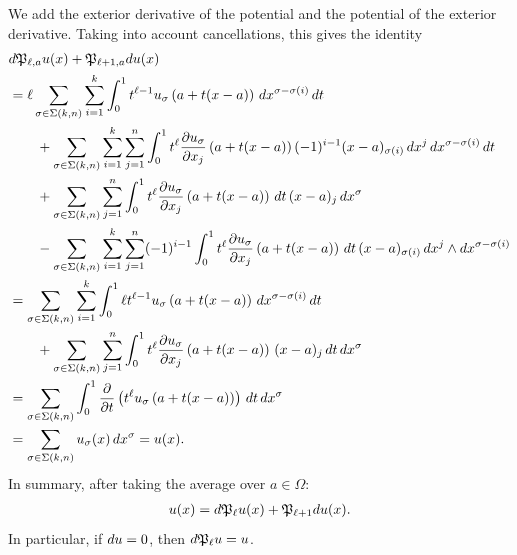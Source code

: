 \documentclass[10pt,letterpaper]{article}
\begin{document}
We add the exterior derivative of the potential and the potential of the exterior derivative.
Taking into account cancellations, this gives the identity 
\begin{align*}
    &
    d {\mathfrak P}_{\ell,a} u(x)
    +
    {\mathfrak P}_{\ell+1,a} d u(x)
    \\&
    =
    \ell
    \sum_{\sigma \in \Sigma(k,n)} \sum_{i=1}^{k}
    \int_{0}^{1} 
    t^{\ell-1} u_{\sigma}\left(a+t(x-a)\right) \,dx^{\sigma-\sigma(i)} \,dt 
    \\&\qquad
    + 
    \sum_{\sigma \in \Sigma(k,n)} \sum_{i=1}^{k} \sum_{j=1}^{n}
    \int_{0}^{1} 
    t^{\ell} \frac{ \partial u_{\sigma} }{\partial x_{j}}\left(a+t(x-a)\right) (-1)^{i-1} (x-a)_{\sigma(i) } \,dx^{j} \,dx^{\sigma-\sigma(i)} \,dt 
    \\&\qquad
    +
    \sum_{\sigma \in \Sigma(k,n)} \sum_{j=1}^{n}
    \int_{0}^{1} t^{\ell} \frac{ \partial u_{\sigma} }{\partial x_{j}}\left(a+t(x-a)\right) \,dt \,(x-a)_{j} \,dx^{\sigma}
    \\&\qquad
    - 
    \sum_{\sigma \in \Sigma(k,n)} \sum_{i=1}^{k} \sum_{j=1}^{n}
    (-1)^{i-1}
    \int_{0}^{1} t^{\ell} \frac{ \partial u_{\sigma} }{\partial x_{j}}\left(a+t(x-a)\right) \,dt 
    \,(x-a)_{\sigma(i)} \,dx^{j} \wedge dx^{\sigma-\sigma(i)}
    \\&
    =
    \sum_{\sigma \in \Sigma(k,n)} \sum_{i=1}^{k}
    \int_{0}^{1} 
    \ell t^{\ell-1} u_{\sigma}\left(a+t(x-a)\right) \,dx^{\sigma-\sigma(i)} \,dt 
    \\&\qquad
    +
    \sum_{\sigma \in \Sigma(k,n)} \sum_{j=1}^{n}
    \int_{0}^{1} t^{\ell} \frac{ \partial u_{\sigma} }{\partial x_{j}}\left(a+t(x-a)\right) \,(x-a)_{j} \,dt \,dx^{\sigma}
    \\&
    =
    \sum_{\sigma \in \Sigma(k,n)} 
    \int_{0}^{1} \frac{\partial}{\partial t} \left( t^{\ell} u_{\sigma}\left(a+t(x-a)\right) \right) \,dt \,dx^{\sigma}
    \\&
    =
    \sum_{\sigma \in \Sigma(k,n)} 
    u_{\sigma}(x) \,dx^{\sigma}
    =
    u(x)
    .
\end{align*}
In summary, after taking the average over $a \in \Omega$:
\begin{align*}
    u(x) = d {\mathfrak P}_{\ell} u(x) + {\mathfrak P}_{\ell+1} d u(x).
\end{align*}
In particular, if $d u = 0$, then $d {\mathfrak P}_{\ell} u = u$.
\end{document}
